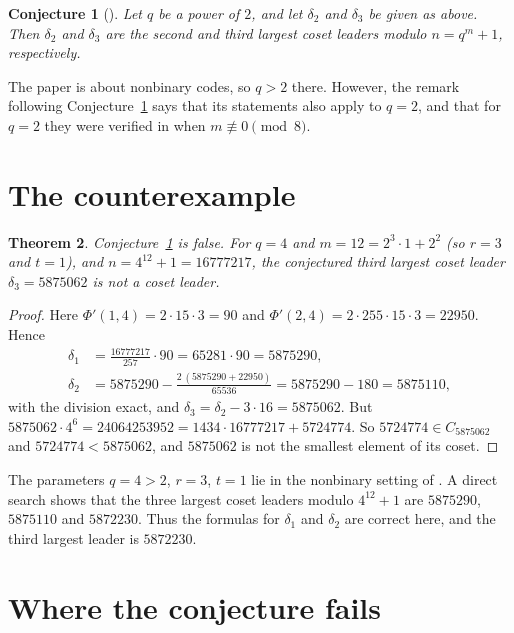 \documentclass[11pt]{amsart}
\newtheorem{theorem}{Theorem}[section]
\newtheorem{conjecture}[theorem]{Conjecture}
\theoremstyle{remark}
\begin{document}
\begin{conjecture}[{\cite[Conjecture~25]{LLGS}}]\label{conj}
Let $q$ be a power of $2$, and let $\delta_2$ and $\delta_3$ be given as above.
Then $\delta_2$ and $\delta_3$ are the second and third largest coset leaders modulo $n=q^m+1$, respectively.
\end{conjecture}

The paper \cite{LLGS} is about nonbinary codes, so $q>2$ there.
However, the remark following Conjecture~\ref{conj} says that its statements also apply to $q=2$, and that for $q=2$ they were verified in \cite{LLFLR} when $m\not\equiv0\pmod 8$.

\section{The counterexample}

\begin{theorem}\label{thm:main}
Conjecture~\ref{conj} is false.
For $q=4$ and $m=12=2^3\cdot1+2^2$ (so $r=3$ and $t=1$), and $n=4^{12}+1=16777217$, the conjectured third largest coset leader $\delta_3=5875062$ is not a coset leader.
\end{theorem}

\begin{proof}
Here $\Phi'(1,4)=2\cdot15\cdot3=90$ and $\Phi'(2,4)=2\cdot255\cdot15\cdot3=22950$.
Hence
\begin{align*}
\delta_1&=\frac{16777217}{257}\cdot 90=65281\cdot 90=5875290,\\
\delta_2&=5875290-\frac{2\,(5875290+22950)}{65536}=5875290-180=5875110,
\end{align*}
with the division exact, and $\delta_3=\delta_2-3\cdot 16=5875062$.
But $5875062\cdot 4^6=24064253952=1434\cdot16777217+5724774$.
So $5724774\in C_{5875062}$ and $5724774<5875062$, and $5875062$ is not the smallest element of its coset.
\end{proof}

The parameters $q=4>2$, $r=3$, $t=1$ lie in the nonbinary setting of \cite{LLGS}.
A direct search shows that the three largest coset leaders modulo $4^{12}+1$ are $5875290$, $5875110$ and $5872230$.
Thus the formulas for $\delta_1$ and $\delta_2$ are correct here, and the third largest leader is $5872230$.

\section{Where the conjecture fails}
\end{document}
